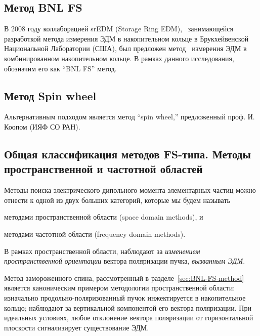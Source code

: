 \newcommand{\wimp}{\w_{\avg{E_v}}}
\newcommand{\wsw}{\w_{B_r}}
\newcommand{\wedm}{\w_{edm}}

\newcommand{\D}{\Delta}

\subsection{Метод BNL FS \label{sec:BNL-FS-method}}
В 2008 году коллаборацией srEDM (Storage Ring EDM),~\cite{BNL:SREDM}  занимающейся разработкой
метода измерения ЭДМ в накопительном кольце в Брукхейвенской
Национальной Лаборатории (США), был предложен метод~\cite{BNL:Deuteron2008}
измерения ЭДМ в комбинированном накопительном кольце. В рамках данного исследования, 
обозначим его как ``BNL FS'' метод. 



\subsection{Метод Spin wheel}\label{sec:SW-method}
Альтернативным подходом является метод ``spin wheel,'' предложенный проф. И. Коопом (ИЯФ СО РАН).~\cite{Koop:SpinWheel2015}


\subsection{Общая классификация методов FS-типа. 
	Методы пространственной и частотной областей}\label{sec:FS-methods:Classification}
Методы поиска электрического дипольного момента элементарных частиц можно отнести к одной из 
двух больших категорий, которые мы будем называть 
\begin{enumerate*}
	\item методами пространственной области (space domain methods), и
	\item методами частотной области (frequency domain methods).
\end{enumerate*}

В рамках пространственной области, наблюдают за \emph{изменением пространственной
ориентации} вектора поляризации пучка, \emph{вызванным ЭДМ}. 

Метод замороженного спина, рассмотренный в разделе~\ref{sec:BNL-FS-method}  является
каноническим примером методологии пространственной области: изначально
продольно-поляризованный пучок инжектируется в накопительное кольцо; наблюдают за 
вертикальной компонентой его вектора поляризации. При идеальных условиях, любое отклонение
вектора поляризации от горизонтальной плоскости сигнализирует существование ЭДМ.


